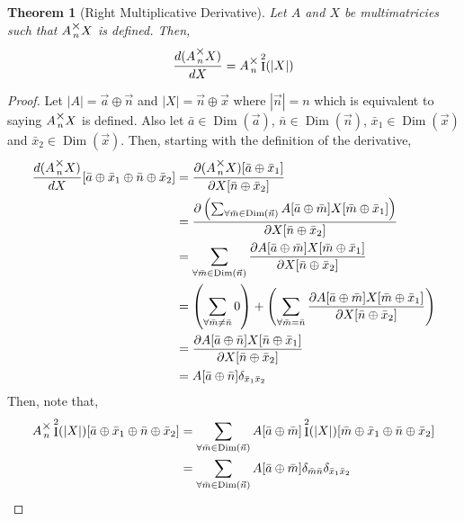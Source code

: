 \documentclass[12pt]{book}
\theoremstyle{definition}
\theoremstyle{plain}
\newtheorem{theorem}{Theorem}[chapter]
\theoremstyle{ppart}
\theoremstyle{case}
\theoremstyle{solution}
\DeclareMathOperator{\Dim}{Dim}
\DeclareMathOperator{\Ident}{I}
\newcommand{\mmult}[1]{\text{\raisebox{1ex}{$\underset{#1}{\times}$}}}
\begin{document}
\begin{theorem}[Right Multiplicative Derivative]
\label{right_mult_derivative}
Let $A$ and $X$ be multimatricies such that $A \mmult{n} X$ is
defined. Then,
\[ \frac{d(A \mmult{n} X)}{dX} = A \mmult{n} \Ident^2(|X|) \]
\end{theorem}
\begin{proof}
Let $|A| = \vec{a} \oplus \vec{n}$ and $|X| = \vec{n} \oplus \vec{x}$
where $|\vec{n}| = n$ which is equivalent to saying $A \mmult{n} X$ is defined.
Also let $\bar{a} \in \Dim(\vec{a})$, $\bar{n} \in \Dim(\vec{n})$,
$\bar{x}_1 \in \Dim(\vec{x})$ and $\bar{x}_2 \in \Dim(\vec{x})$.
Then, starting with the definition of the derivative,
\begin{align*}
  \frac{d(A\mmult{n}X)}{dX}[\bar{a} \oplus \bar{x}_1 \oplus \bar{n} \oplus \bar{x}_2]
  &=
  \frac{
    \partial (A \mmult{n} X)[\bar{a} \oplus \bar{x}_1]
  }{
    \partial X[\bar{n} \oplus \bar{x}_2]
  } \\
  &=
  \frac{
    \partial \left(
      \sum_{\forall \bar{m} \in \Dim(\vec{n})}
        A[\bar{a} \oplus \bar{m}]
        X[\bar{m} \oplus \bar{x}_1]
    \right)
  }{
    \partial X[\bar{n} \oplus \bar{x}_2]
  } \\
  &=
  \sum_{\forall \bar{m} \in \Dim(\vec{n})}
    \frac{
      \partial 
      A[\bar{a} \oplus \bar{m}]
      X[\bar{m} \oplus \bar{x}_1]
    }{
      \partial X[\bar{n} \oplus \bar{x}_2]
    } \\
  &=
  \left(
    \sum_{\forall \bar{m} \ne \bar{n}} 0
  \right)
  +
  \left(
    \sum_{\forall \bar{m} = \bar{n}}
    \frac{
      \partial 
      A[\bar{a} \oplus \bar{m}]
      X[\bar{m} \oplus \bar{x}_1]
    }{
      \partial X[\bar{n} \oplus \bar{x}_2]
    }
  \right) \\
  &=
  \frac{
    \partial 
    A[\bar{a} \oplus \bar{n}]
    X[\bar{n} \oplus \bar{x}_1]
  }{
    \partial X[\bar{n} \oplus \bar{x}_2]
  } \\
  &= A[\bar{a} \oplus \bar{n}] \delta_{\bar{x}_1 \bar{x}_2}
\end{align*}
Then, note that,
\begin{align*}
  A \mmult{n} \Ident^2(|X|)[\bar{a} \oplus \bar{x}_1 \oplus \bar{n} \oplus \bar{x}_2]
  &=
  \sum_{\forall \bar{m} \in \Dim(\vec{n})}
  A[\bar{a} \oplus \bar{m}]
  \Ident^2(|X|)[\bar{m} \oplus \bar{x}_1 \oplus \bar{n} \oplus \bar{x}_2] \\
  &=
  \sum_{\forall \bar{m} \in \Dim(\vec{n})}
  A[\bar{a} \oplus \bar{m}]
  \delta_{\bar{m} \bar{n}}
  \delta_{\bar{x}_1 \bar{x}_2} \\

\end{align*}
\end{proof}
\end{document}
